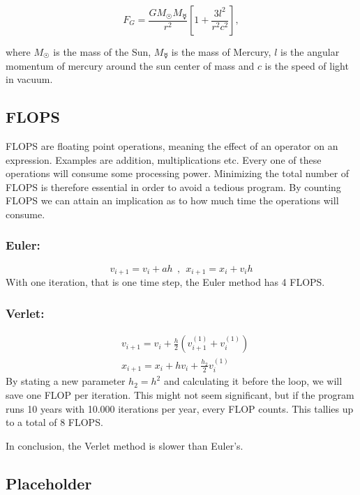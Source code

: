 \documentclass[10pt]{article}
\begin{document}
\begin{multicols}{2}
\begin{equation}
    F_G = \frac{GM_{\Sun}M_{\Mercury}}{r^2}
    \left[1+\frac{3l^2}{r^2 c^2}\right] ,
\end{equation}

where  $M_\Sun$ is the mass of the Sun, $M_\Mercury$ is the
mass of Mercury, $l$ is the angular momentum of mercury around the sun
center of mass and $c$ is the speed of light in vacuum.

\subsection{FLOPS}
FLOPS are floating point operations, meaning the effect of an operator on an expression. Examples are addition, multiplications etc. Every one of these operations will consume some processing power. Minimizing the total number of FLOPS is therefore essential in order to avoid a tedious program. By counting FLOPS we can attain an implication as to how much time the operations will consume.
\subsubsection{Euler:} 
\begin{equation}
    \boxed{v_{i+1}=v_i+ah}\ \ , \ \ \boxed{x_{i+1}=x_i+v_ih} 
\end{equation}
With one iteration, that is one time step, the Euler method has 4 FLOPS.

\subsubsection{Verlet:}
\begin{align}
    &\boxed{v_{i+1}=v_i+\frac{h}{2}\left(v_{i+1}^{(1)}+v_{i}^{(1)}\right)}\nonumber\\
    &\boxed{x_{i+1}=x_i+hv_i + \frac{h_2}{2} v_{i}^{(1)}}
\end{align}
By stating a new parameter $h_2 = h^2$ and calculating it before the loop, we will save one FLOP per iteration. This might not seem significant, but if the program runs 10 years with 10.000 iterations per year, every FLOP counts. This tallies up to a total of 8 FLOPS.

In conclusion, the Verlet method is slower than Euler's. 



\subsection{Placeholder}



\end{multicols}
\end{document}
